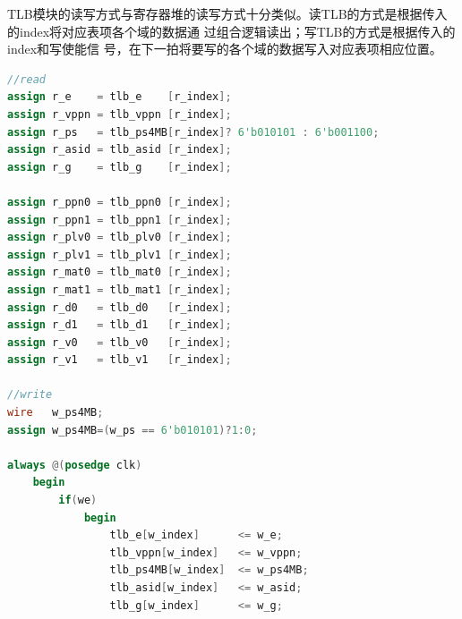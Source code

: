 \documentclass[11pt]{article}
\begin{document}
\begin{enumerate}
  TLB模块的读写方式与寄存器堆的读写方式十分类似。读TLB的方式是根据传入的index将对应表项各个域的数据通
  过组合逻辑读出；写TLB的方式是根据传入的index和写使能信
  号，在下一拍将要写的各个域的数据写入对应表项相应位置。
  \begin{lstlisting}[language=verilog]
    //read
assign r_e    = tlb_e    [r_index];
assign r_vppn = tlb_vppn [r_index];
assign r_ps   = tlb_ps4MB[r_index]? 6'b010101 : 6'b001100;
assign r_asid = tlb_asid [r_index];
assign r_g    = tlb_g    [r_index];

assign r_ppn0 = tlb_ppn0 [r_index];
assign r_ppn1 = tlb_ppn1 [r_index];
assign r_plv0 = tlb_plv0 [r_index];
assign r_plv1 = tlb_plv1 [r_index];
assign r_mat0 = tlb_mat0 [r_index];
assign r_mat1 = tlb_mat1 [r_index];
assign r_d0   = tlb_d0   [r_index];
assign r_d1   = tlb_d1   [r_index];
assign r_v0   = tlb_v0   [r_index];
assign r_v1   = tlb_v1   [r_index];

//write
wire   w_ps4MB;
assign w_ps4MB=(w_ps == 6'b010101)?1:0;

always @(posedge clk)
    begin
        if(we)
            begin
                tlb_e[w_index]      <= w_e;
                tlb_vppn[w_index]   <= w_vppn;
                tlb_ps4MB[w_index]  <= w_ps4MB;
                tlb_asid[w_index]   <= w_asid;
                tlb_g[w_index]      <= w_g;


\end{lstlisting}
\end{enumerate}
\end{document}
